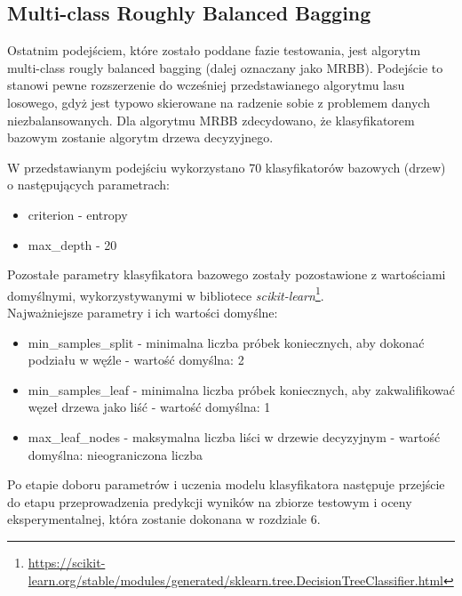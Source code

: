 \subsection{Multi-class Roughly Balanced Bagging}
\noindent Ostatnim podejściem, które zostało poddane fazie testowania, jest algorytm multi-class rougly balanced bagging (dalej oznaczany jako MRBB). Podejście to stanowi pewne rozszerzenie do wcześniej przedstawianego algorytmu lasu losowego, gdyż jest typowo skierowane na radzenie sobie z problemem danych niezbalansowanych. Dla algorytmu MRBB zdecydowano, że klasyfikatorem bazowym zostanie algorytm drzewa decyzyjnego.

W przedstawianym podejściu wykorzystano 70 klasyfikatorów bazowych (drzew) o następujących parametrach:
\begin{itemize}
    \item criterion - entropy
    \item max\_depth - 20
\end{itemize}
Pozostałe parametry klasyfikatora bazowego zostały pozostawione z wartościami domyślnymi, wykorzystywanymi w bibliotece \textit{scikit-learn}\footnote{\url{https://scikit-learn.org/stable/modules/generated/sklearn.tree.DecisionTreeClassifier.html}}.\\

Najważniejsze parametry i ich wartości domyślne:

\begin{itemize}
    \item min\_samples\_split - minimalna liczba próbek koniecznych, aby dokonać podziału w węźle - wartość domyślna: 2
    \item min\_samples\_leaf - minimalna liczba próbek koniecznych, aby zakwalifikować węzeł drzewa jako liść - wartość domyślna: 1
    \item max\_leaf\_nodes - maksymalna liczba liści w drzewie decyzyjnym - wartość domyślna: nieograniczona liczba
\end{itemize}

Po etapie doboru parametrów i uczenia modelu klasyfikatora następuje przejście do etapu przeprowadzenia predykcji wyników na zbiorze testowym i oceny eksperymentalnej, która zostanie dokonana w rozdziale 6.